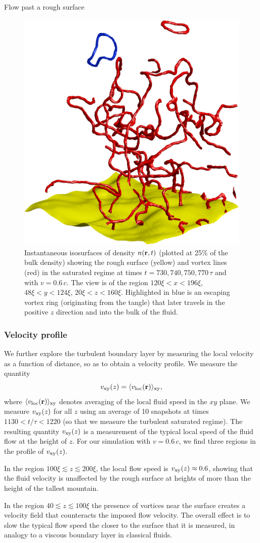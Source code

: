 \begin{chapter}{\label{cha:afm}Flow past a rough surface}
\begin{figure}
\begin{center}
\includegraphics[width=0.25\linewidth]{./afm/mill4}%
\end{center}
\caption{Instantaneous isosurfaces of density $n({\bf r},t)$ 
(plotted at 25\%  of the bulk density) showing the rough surface (yellow) and vortex lines (red) in the saturated regime at times $t=730,740,750,770\,\tau$ and with $v=0.6\,c$. The view is of the region $120\xi<x<196\xi$, $48\xi<y<124\xi$, $20\xi<z<160\xi$. Highlighted in blue is an escaping vortex ring (originating from the tangle) that later travels in the positive $z$ direction and into the bulk of the fluid.}
\label{fig:escapering}
\end{figure}

\subsubsection{Velocity profile}
We further explore the turbulent boundary layer by measuring the local velocity as a function of distance, so as to obtain a velocity profile. We measure the quantity 
\begin{equation}
  v_{\rm xy}(z) = \langle v_{\rm loc}({\bf r}) \rangle_{\rm xy},
\end{equation}
where $\langle v_{\rm loc}({\bf r}) \rangle_{\rm xy}$ denotes averaging of the local fluid speed in the $xy$ plane. We measure $v_{\rm xy}(z)$ for all $z$ using an average of 10 snapshots at times $1130<t/\tau<1220$ (so that we measure the turbulent saturated regime). The resulting quantity $v_{\rm xy}(z)$ is a measurement of the typical local speed of the fluid flow at the height of $z$. For our simulation with $v=0.6\,c$, we find three regions in the profile of $v_{\rm xy}(z)$.

In the region $100\xi \lesssim z \lesssim 200\xi$, the local flow speed is $v_{\rm xy}(z)\approx0.6$, showing that the fluid velocity is unaffected by the rough surface at heights of more than the height of the tallest mountain.

In the region $40 \lesssim z \lesssim 100\xi$ the presence of vortices near the surface creates a velocity field that counteracts the imposed flow velocity. The overall effect is to slow the typical flow speed the closer to the surface that it is measured, in analogy to a viscous boundary layer in classical fluids.


\end{chapter}
